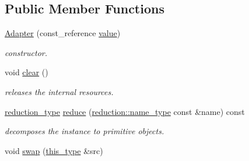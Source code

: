 \subsection*{Public Member Functions}
\begin{DoxyCompactItemize}
\item 
\hypertarget{classhryky_1_1http_1_1header_1_1product__comment_1_1_adapter_aa461a60e3fc7d367fa3dbe796174957c}{\hyperlink{classhryky_1_1http_1_1header_1_1product__comment_1_1_adapter_aa461a60e3fc7d367fa3dbe796174957c}{Adapter} (const\-\_\-reference \hyperlink{classhryky_1_1_adapter_ab736ecd30f215ca3cbd2364f818cb83f}{value})}\label{classhryky_1_1http_1_1header_1_1product__comment_1_1_adapter_aa461a60e3fc7d367fa3dbe796174957c}

\begin{DoxyCompactList}\small\item\em constructor. \end{DoxyCompactList}\item 
\hypertarget{classhryky_1_1_adapter_adbdbd187b837f6782b776ca8aabd411b}{void \hyperlink{classhryky_1_1_adapter_adbdbd187b837f6782b776ca8aabd411b}{clear} ()}\label{classhryky_1_1_adapter_adbdbd187b837f6782b776ca8aabd411b}

\begin{DoxyCompactList}\small\item\em releases the internal resources. \end{DoxyCompactList}\item 
\hypertarget{classhryky_1_1_adapter_a42532b43ac680d162bbc1a2e3ebc6b99}{\hyperlink{namespacehryky_a343a9a4c36a586be5c2693156200eadc}{reduction\-\_\-type} \hyperlink{classhryky_1_1_adapter_a42532b43ac680d162bbc1a2e3ebc6b99}{reduce} (\hyperlink{namespacehryky_1_1reduction_ac686c30a4c8d196bbd0f05629a6b921f}{reduction\-::name\-\_\-type} const \&name) const}\label{classhryky_1_1_adapter_a42532b43ac680d162bbc1a2e3ebc6b99}

\begin{DoxyCompactList}\small\item\em decomposes the instance to primitive objects. \end{DoxyCompactList}\item 
\hypertarget{classhryky_1_1_adapter_ae95517793bc16f6ba623bc994bc17c43}{void \hyperlink{classhryky_1_1_adapter_ae95517793bc16f6ba623bc994bc17c43}{swap} (\hyperlink{classhryky_1_1http_1_1header_1_1product__comment_1_1_adapter_a818c0abc62d0753ad7e17ce1a8a633a2}{this\-\_\-type} \&src)}\label{classhryky_1_1_adapter_ae95517793bc16f6ba623bc994bc17c43}


\end{DoxyCompactItemize}
